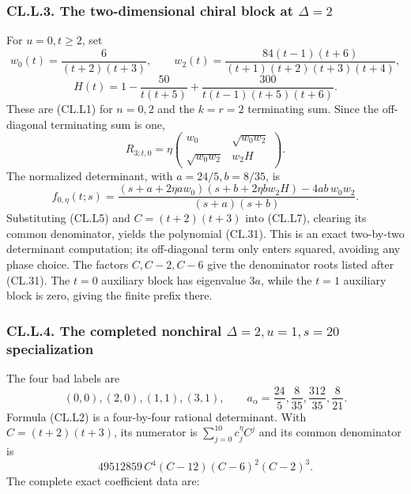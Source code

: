 \documentclass[a4paper,11pt]{article}
\numberwithin{equation}{section}
\begin{document}
\hypertarget{cl.l.3.-the-two-dimensional-chiral-block-at-delta2}{%
\subsubsection{\texorpdfstring{CL.L.3. The two-dimensional chiral block at \(\Delta=2\)}{CL.L.3. The two-dimensional chiral block at \textbackslash Delta=2}}\label{cl.l.3.-the-two-dimensional-chiral-block-at-delta2}}

For \(u=0,t\geq2\), set \[
w_0(t)=\frac6{(t+2)(t+3)},\qquad
w_2(t)=\frac{84(t-1)(t+6)}
{(t+1)(t+2)(t+3)(t+4)},
\] \[
H(t)=1-\frac{50}{t(t+5)}
+\frac{300}{t(t-1)(t+5)(t+6)}.
\tag{CL.L5}
\] These are (CL.L1) for \(n=0,2\) and the \(k=r=2\) terminating sum. Since the off-diagonal terminating sum is one, \[
R_{3;t,0}=\eta
\begin{pmatrix}
w_0&\sqrt{w_0w_2}\\
\sqrt{w_0w_2}&w_2H
\end{pmatrix}.
\tag{CL.L6}
\] The normalized determinant, with \(a=24/5,b=8/35\), is \[
f_{0,\eta}(t;s)=
\frac{(s+a+2\eta aw_0)(s+b+2\eta bw_2H)
-4ab\,w_0w_2}{(s+a)(s+b)}.
\tag{CL.L7}
\] Substituting (CL.L5) and \(C=(t+2)(t+3)\) into (CL.L7), clearing its common denominator, yields the polynomial (CL.31). This is an exact two-by-two determinant computation; its off-diagonal term only enters squared, avoiding any phase choice. The factors \(C,C-2,C-6\) give the denominator roots listed after (CL.31). The \(t=0\) auxiliary block has eigenvalue \(3a\), while the \(t=1\) auxiliary block is zero, giving the finite prefix there.

\hypertarget{cl.l.4.-the-completed-nonchiral-delta2u1s20-specialization}{%
\subsubsection{\texorpdfstring{CL.L.4. The completed nonchiral \(\Delta=2,u=1,s=20\) specialization}{CL.L.4. The completed nonchiral \textbackslash Delta=2,u=1,s=20 specialization}}\label{cl.l.4.-the-completed-nonchiral-delta2u1s20-specialization}}

The four bad labels are \[
(0,0),(2,0),(1,1),(3,1),\qquad
a_\alpha=\frac{24}{5},\frac8{35},\frac{312}{35},\frac8{21}.
\] Formula (CL.L2) is a four-by-four rational determinant. With \(C=(t+2)(t+3)\), its numerator is \(\sum_{j=0}^{10}c_j^\eta C^j\) and its common denominator is \[
49512859\,C^4(C-12)(C-6)^2(C-2)^3.
\tag{CL.L8}
\] The complete exact coefficient data are:
\end{document}

